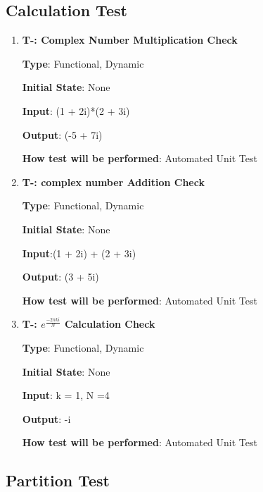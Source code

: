 \documentclass[12pt, titlepage]{article}
\newcounter{tnum}
\begin{document}
\subsection{Calculation Test}

\begin{enumerate}

\item{\textbf{T-\thetnum \label{CCC}: Complex Number Multiplication Check}}

\textbf {Type}: Functional, Dynamic
					
\textbf {Initial State}: None
					
\textbf {Input}: (1 + 2i)*(2 + 3i)
					
\textbf {Output}: (-5 + 7i)
					
\textbf {How test will be performed}: Automated Unit Test

\item{\textbf{T-\thetnum \label{CCA}: complex number Addition Check}}

\textbf {Type}: Functional, Dynamic
					
\textbf {Initial State}: None
					
\textbf {Input}:(1 + 2i) + (2 + 3i)
					
\textbf {Output}: (3 + 5i)
					
\textbf {How test will be performed}:  Automated Unit Test


\item{\textbf{T-\thetnum \label{FZ}: $e^{\frac{-2\pi ki}{N}}$ Calculation Check}}

\textbf {Type}: Functional, Dynamic
					
\textbf {Initial State}: None
					
\textbf {Input}: k = 1, N =4
					
\textbf {Output}: -i
					
\textbf {How test will be performed}:  Automated Unit Test

\end{enumerate}	

\subsection{Partition Test}
\end{document}
